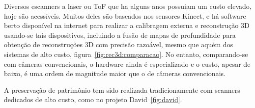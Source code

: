 
Diversos escanners a laser ou ToF
que ha alguns anos possuiam um custo elevado, hoje são acessíveis. Muitos deles
são baseados nos sensores Kinect, e há software berto disponível na internet
para realizar a calibragem externa e reconstrução 3D usando-se tais
dispositivos, incluindo a fusão de mapas de profundidade para obtenção de
reconstruções 3D com precisão razoável, mesmo que aquém dos sistemas de alto
custo, figura~\ref{fig:rec3d:comparacao}.  No entanto, comparando-se com câmeras convencionais,
o hardware ainda é especializado e o custo, apesar de baixo, é uma ordem de
magnitude maior que o de câmeras convencionais.


A preservação de patrimônio tem sido realizada tradicionamente com scanners
dedicados de alto custo, como no projeto David~\ref{fig:david}.

